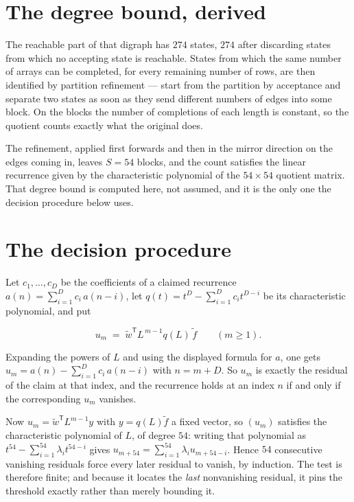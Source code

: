 \documentclass[11pt]{article}
\theoremstyle{definition}
\begin{document}
\section{The degree bound, derived}

The reachable part of that digraph has $274$ states, $274$ after discarding states from which no accepting state is reachable. States from which the same number of arrays can be completed, for every remaining number of rows, are then identified by partition refinement --- start from the partition by acceptance and separate two states as soon as they send different numbers of edges into some block. On the blocks the number of completions of each length is constant, so the quotient counts exactly what the original does.

The refinement, applied first forwards and then in the mirror direction on the edges coming in, leaves $S = 54$ blocks, and the count satisfies the linear recurrence given by the characteristic polynomial of the $54 \times 54$ quotient matrix. That degree bound is computed here, not assumed, and it is the only one the decision procedure below uses.

\section{The decision procedure}

Let $c_1,\dots,c_D$ be the coefficients of a claimed recurrence $a(n) = \sum_{i=1}^{D} c_i\,a(n-i)$, let $q(t) = t^{D} - \sum_{i=1}^{D} c_i t^{D-i}$ be its characteristic polynomial, and put

\[u_m \;=\; \tilde w^{\mathsf T} L^{\,m-1} q(L)\,\tilde f \qquad (m \ge 1).\]

Expanding the powers of $L$ and using the displayed formula for $a$, one gets $u_m = a(n) - \sum_{i=1}^{D} c_i\,a(n-i)$ with $n = m + D$. So $u_m$ is exactly the residual of the claim at that index, and the recurrence holds at an index $n$ if and only if the corresponding $u_m$ vanishes.

Now $u_m = \tilde w^{\mathsf T} L^{m-1} y$ with $y = q(L)\tilde f$ a fixed vector, so $(u_m)$ satisfies the characteristic polynomial of $L$, of degree $54$: writing that polynomial as $t^{54} - \sum_{i=1}^{54} \lambda_i t^{54-i}$ gives $u_{m+54} = \sum_{i=1}^{54} \lambda_i u_{m+54-i}$. Hence $54$ consecutive vanishing residuals force every later residual to vanish, by induction. The test is therefore finite; and because it locates the {\itshape last} nonvanishing residual, it pins the threshold exactly rather than merely bounding it.
\end{document}
